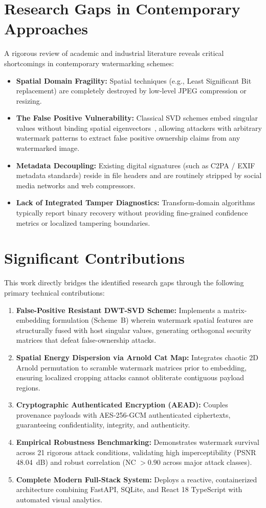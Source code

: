 \documentclass[12pt,a4paper]{report}
\begin{document}
\section{Research Gaps in Contemporary Approaches}
A rigorous review of academic and industrial literature reveals critical shortcomings in contemporary watermarking schemes:
\begin{itemize}
    \item \textbf{Spatial Domain Fragility:} Spatial techniques (e.g., Least Significant Bit replacement) are completely destroyed by low-level JPEG compression or resizing.
    \item \textbf{The False Positive Vulnerability:} Classical SVD schemes embed singular values without binding spatial eigenvectors~\cite{liu2002svd,chung2007false}, allowing attackers with arbitrary watermark patterns to extract false positive ownership claims from any watermarked image.
    \item \textbf{Metadata Decoupling:} Existing digital signatures (such as C2PA / EXIF metadata standards) reside in file headers and are routinely stripped by social media networks and web compressors.
    \item \textbf{Lack of Integrated Tamper Diagnostics:} Transform-domain algorithms typically report binary recovery without providing fine-grained confidence metrics or localized tampering boundaries.
\end{itemize}

\section{Significant Contributions}
This work directly bridges the identified research gaps through the following primary technical contributions:
\begin{enumerate}
    \item \textbf{False-Positive Resistant DWT-SVD Scheme:} Implements a matrix-embedding formulation (Scheme~B) wherein watermark spatial features are structurally fused with host singular values, generating orthogonal security matrices that defeat false-ownership attacks.
    \item \textbf{Spatial Energy Dispersion via Arnold Cat Map:} Integrates chaotic 2D Arnold permutation to scramble watermark matrices prior to embedding, ensuring localized cropping attacks cannot obliterate contiguous payload regions.
    \item \textbf{Cryptographic Authenticated Encryption (AEAD):} Couples provenance payloads with AES-256-GCM authenticated ciphertexts, guaranteeing confidentiality, integrity, and authenticity.
    \item \textbf{Empirical Robustness Benchmarking:} Demonstrates watermark survival across 21 rigorous attack conditions, validating high imperceptibility (PSNR 48.04~dB) and robust correlation (NC $> 0.90$ across major attack classes).
    \item \textbf{Complete Modern Full-Stack System:} Deploys a reactive, containerized architecture combining FastAPI, SQLite, and React 18 TypeScript with automated visual analytics.
\end{enumerate}
\end{document}
